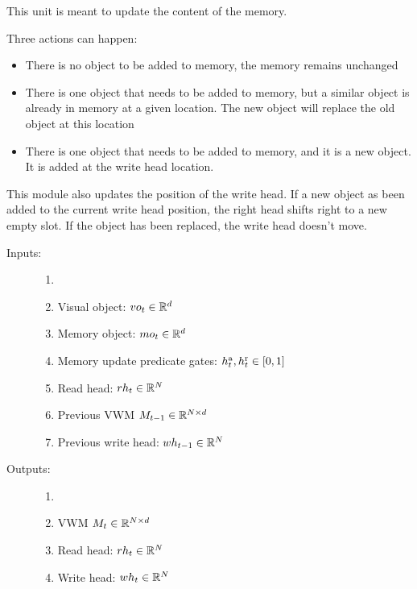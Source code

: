 
This unit is meant to update the content of the memory. 

Three actions can happen:

\begin{itemize}
	\item There is no object to be added to memory, the memory remains unchanged
	\item There is one object that needs to be added to memory, but a similar object is already in memory at a given location. The new object will replace the old object at this location
	
	\item There is one object that needs to be added to memory, and  it is a new object. It is added at the write head location.
\end{itemize}


This module also updates the position of the write head. If a new object as been added to the current write head position, the right head shifts right to a new empty slot. If the object has been replaced, the write head doesn't move.

\begin{description}
	\item[Inputs:] 
	\begin{enumerate}
		\item[]
		\item Visual object: $vo_t \in \mathbb{R}^d$
		\item Memory object: $mo_t \in \mathbb{R}^d$
		\item Memory update predicate gates:  $h^{\mathrm{a}}_t, h^{\mathrm{r}}_t \in [0,1]$
		\item Read head: $rh_t \in \mathbb{R}^N$
		\item Previous VWM $M_{t-1} \in \mathbb{R}^{N \times d}$
		\item Previous write head: $wh_{t-1} \in \mathbb{R}^N$
	\end{enumerate}
	
	\item[Outputs:] 
	\begin{enumerate}
		\item[]
		\item VWM $M_t \in \mathbb{R}^{N \times d}$
		\item Read head: $rh_t \in \mathbb{R}^N$
		\item Write head: $wh_t \in \mathbb{R}^N$
	\end{enumerate}
	
\end{description}



